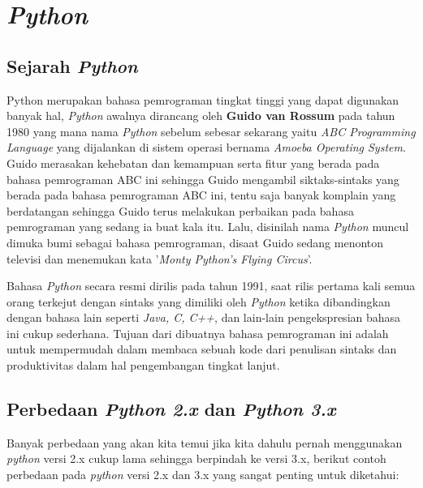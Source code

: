 \chapter{\textit{Python}}

\section{Sejarah \textit{Python}}
Python merupakan bahasa pemrograman tingkat tinggi yang dapat digunakan banyak hal, \textit{Python} awalnya dirancang oleh \textbf{Guido van Rossum} pada tahun 1980 yang mana nama \textit{Python} sebelum sebesar sekarang yaitu \textit{ABC Programming Language} yang dijalankan di sistem operasi bernama \textit{Amoeba Operating System}. Guido merasakan kehebatan dan kemampuan serta fitur yang berada pada bahasa pemrograman ABC ini sehingga Guido mengambil siktaks-sintaks yang berada pada bahasa pemrograman ABC ini, tentu saja banyak komplain yang berdatangan sehingga Guido terus melakukan perbaikan pada bahasa pemrograman yang sedang ia buat kala itu. Lalu, disinilah nama \textit{Python} muncul dimuka bumi sebagai bahasa pemrograman, disaat Guido sedang menonton televisi dan menemukan kata '\textit{Monty Python's Flying Circus}'.

Bahasa \textit{Python} secara resmi dirilis pada tahun 1991, saat rilis pertama kali semua orang terkejut dengan sintaks yang dimiliki oleh \textit{Python} ketika dibandingkan dengan bahasa lain seperti \textit{Java, C, C++}, dan lain-lain pengekspresian bahasa ini cukup sederhana. Tujuan dari dibuatnya bahasa pemrograman ini adalah untuk mempermudah dalam membaca sebuah kode dari penulisan sintaks dan produktivitas dalam hal pengembangan tingkat lanjut.

\section{Perbedaan \textit{Python 2.x} dan \textit{Python 3.x}}
Banyak perbedaan yang akan kita temui jika kita dahulu pernah menggunakan \textit{python} versi 2.x cukup lama sehingga berpindah ke versi 3.x, berikut contoh perbedaan pada \textit{python} versi 2.x dan 3.x yang sangat penting untuk diketahui:

